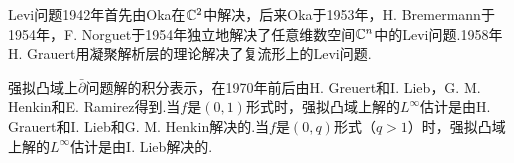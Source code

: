 Levi问题1942年首先由Oka在$\mathbb C^2$中解决，后来Oka于1953年，H. Bremermann\cite{bremermann1954aquivalenz}于1954年，F. Norguet\cite{norguet1954domaines}于1954年独立地解决了任意维数空间$\mathbb C^n$中的Levi问题.1958年H. Grauert\cite{grauert1958levi}用凝聚解析层的理论解决了复流形上的Levi问题.

强拟凸域上$\bar{\partial}$问题解的积分表示，在1970年前后由H. Greuert和I. Lieb\cite{grauert1970ramirezsche}，G. M. Henkin\cite{henkin1969integral,henkin1970integral}和E. Ramirez\cite{ramirez1970divisions}得到.当$f$是$(0,1)$形式时，强拟凸域上解的$L^\infty$估计是由H. Grauert和I. Lieb\cite{grauert1970ramirezsche}和G. M. Henkin\cite{henkin1970integral}解决的.当$f$是$(0,q)$形式（$q>1$）时，强拟凸域上解的$L^\infty$估计是由I. Lieb\cite{lieb1970cauchy}解决的.